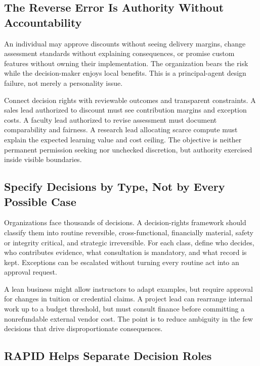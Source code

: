 \subsection{The Reverse Error Is Authority Without Accountability}
\label{sec:authority_without_accountability}

An individual may approve discounts without seeing delivery margins, change assessment standards without explaining consequences, or promise custom features without owning their implementation. The organization bears the risk while the decision-maker enjoys local benefits. This is a principal-agent design failure, not merely a personality issue.

Connect decision rights with reviewable outcomes and transparent constraints. A sales lead authorized to discount must see contribution margins and exception costs. A faculty lead authorized to revise assessment must document comparability and fairness. A research lead allocating scarce compute must explain the expected learning value and cost ceiling. The objective is neither permanent permission seeking nor unchecked discretion, but authority exercised inside visible boundaries.

\subsection{Specify Decisions by Type, Not by Every Possible Case}
\label{sec:specify_decisions_by_type}

Organizations face thousands of decisions. A decision-rights framework should classify them into routine reversible, cross-functional, financially material, safety or integrity critical, and strategic irreversible. For each class, define who decides, who contributes evidence, what consultation is mandatory, and what record is kept. Exceptions can be escalated without turning every routine act into an approval request.

A lean business might allow instructors to adapt examples, but require approval for changes in tuition or credential claims. A project lead can rearrange internal work up to a budget threshold, but must consult finance before committing a nonrefundable external vendor cost. The point is to reduce ambiguity in the few decisions that drive disproportionate consequences.

\subsection{RAPID Helps Separate Decision Roles}
\label{sec:rapid_decision_roles}

